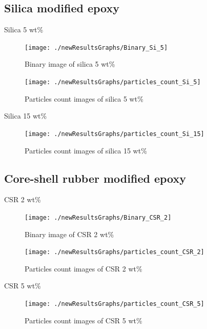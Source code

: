 \documentclass[numbers=noendperiod,chapterprefix=on]{icldt} %
\begin{document}
\subsection{Silica modified epoxy}
Silica 5 wt\%

\begin{figure}[!hp]
\centering
\texttt{[image: ./newResultsGraphs/Binary\_Si\_5]}
\caption{Binary image of silica 5 wt\%} \label{Binary_Si_5}
\end{figure}
\FloatBarrier

\begin{figure}[!hp]
\centering
\texttt{[image: ./newResultsGraphs/particles\_count\_Si\_5]}
\caption{Particles count images of silica 5 wt\%} \label{particles_count_Si_5}
\end{figure}
\FloatBarrier

Silica 15 wt\%

\begin{figure}[!hp]
\centering
\texttt{[image: ./newResultsGraphs/particles\_count\_Si\_15]}
\caption{Particles count images of silica 15 wt\%} \label{particles_count_Si_15}
\end{figure}
\FloatBarrier
\newpage
\subsection{Core-shell rubber modified epoxy}
CSR 2 wt\%

\begin{figure}[!hp]
\centering
\texttt{[image: ./newResultsGraphs/Binary\_CSR\_2]}
\caption{Binary image of CSR 2 wt\%} \label{Binary_CSR_2}
\end{figure}
\FloatBarrier

\begin{figure}[!hp]
\centering
\texttt{[image: ./newResultsGraphs/particles\_count\_CSR\_2]}
\caption{Particles count images of CSR 2 wt\%} \label{particles_count_CSR_2}
\end{figure}
\FloatBarrier

\newpage
CSR 5 wt\%


\begin{figure}[!hp]
\centering
\texttt{[image: ./newResultsGraphs/particles\_count\_CSR\_5]}
\caption{Particles count images of CSR 5 wt\%} \label{particles_count_CSR_5}
\end{figure}
\FloatBarrier
\end{document}
